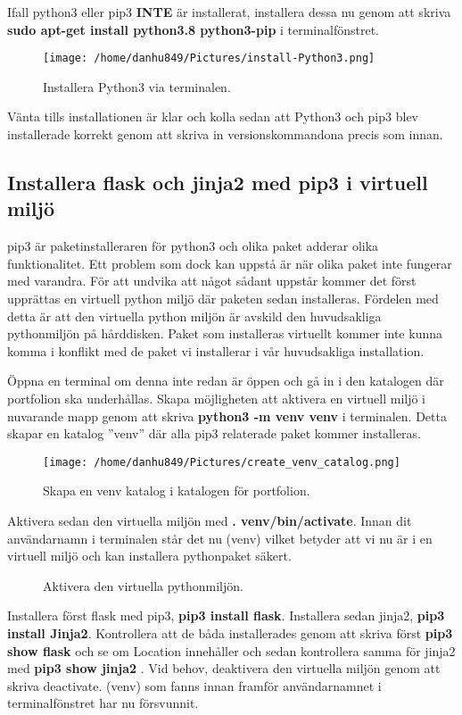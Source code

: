 \documentclass{TDP003mall}
\begin{document}
Ifall python3 eller pip3 \textbf{INTE} är installerat, installera dessa nu genom att skriva \textbf{sudo apt-get install python3.8 python3-pip} i terminalfönstret.

\begin{figure}[h]
  \centerline{\texttt{[image: /home/danhu849/Pictures/install-Python3.png]}}
  \caption{Installera Python3 via terminalen.}
  \label{fig}
\end{figure}
Vänta tills installationen är klar och kolla sedan att Python3 och pip3 blev installerade korrekt genom att skriva in versionskommandona precis som innan.

\subsection{Installera flask och jinja2 med pip3 i virtuell miljö}
pip3 är paketinstalleraren för python3 och olika paket adderar olika funktionalitet. Ett problem som dock kan uppstå är när olika paket inte fungerar med varandra. För att undvika att något sådant uppstår kommer det först upprättas en virtuell python miljö där paketen sedan installeras. Fördelen med detta är att den virtuella python miljön är avskild den huvudsakliga pythonmiljön på hårddisken. Paket som installeras virtuellt kommer inte kunna komma i konflikt med de paket vi installerar i vår huvudsakliga installation.

Öppna en terminal om denna inte redan är öppen och gå in i den katalogen där portfolion ska underhållas. Skapa möjligheten att aktivera en virtuell miljö i nuvarande mapp genom att skriva \textbf{python3 -m venv venv} i terminalen. Detta skapar en katalog ''venv'' där alla pip3 relaterade paket kommer installeras. 
\begin{figure}[h]
  \centerline{\texttt{[image: /home/danhu849/Pictures/create\_venv\_catalog.png]}}
  \caption{Skapa en venv katalog i katalogen för portfolion.}
  \label{fig}
\end{figure}
Aktivera sedan den virtuella miljön med \textbf{. venv/bin/activate}. Innan dit användarnamn i terminalen står det nu (venv) vilket betyder att vi nu är i en virtuell miljö och kan installera pythonpaket säkert.
\begin{figure}[h]
  \centerline{}
  \caption{Aktivera den virtuella pythonmiljön.}
  \label{fig}
\end{figure}

Installera först flask med pip3, \textbf{pip3 install flask}. Installera sedan jinja2, \textbf{pip3 install Jinja2}. Kontrollera att de båda installerades genom att skriva först \textbf{pip3 show flask} och se om Location innehåller  och sedan kontrollera samma för jinja2 med  \textbf{pip3 show jinja2} . Vid behov, deaktivera den virtuella miljön genom att skriva deactivate. (venv) som fanns innan framför användarnamnet i terminalfönstret har nu försvunnit.
\end{document}

